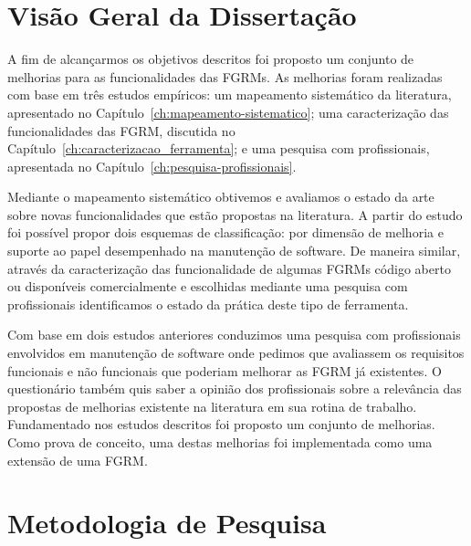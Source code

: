 
\section{Visão Geral da Dissertação}
\label{sec:intro-visao-geral}

A fim de alcançarmos os objetivos descritos foi proposto um conjunto de
melhorias para as funcionalidades das FGRMs. As melhorias foram realizadas com
base em três estudos empíricos: um mapeamento sistemático da literatura,
apresentado no Capítulo~\ref{ch:mapeamento-sistematico}; uma caracterização das
funcionalidades das FGRM, discutida no
Capítulo~\ref{ch:caracterizacao_ferramenta}; e uma pesquisa com profissionais,
apresentada no Capítulo~\ref{ch:pesquisa-profissionais}.

Mediante o mapeamento sistemático obtivemos e avaliamos o estado da arte sobre
novas funcionalidades que estão propostas na literatura. A partir do estudo foi
possível propor dois esquemas de classificação: por dimensão de melhoria e
suporte ao papel desempenhado na manutenção de software. De maneira similar,
através da caracterização das funcionalidade de algumas FGRMs código aberto ou
disponíveis comercialmente e escolhidas mediante uma pesquisa com profissionais
identificamos o estado da prática deste tipo de ferramenta.

Com base em dois estudos anteriores conduzimos uma pesquisa com profissionais
envolvidos em manutenção de software onde pedimos que avaliassem os requisitos
funcionais e não funcionais que poderiam melhorar as FGRM já existentes. O
questionário também quis saber a opinião dos profissionais sobre a relevância
das propostas de me\-lho\-ri\-as existente na literatura em sua rotina de
trabalho. Fundamentado nos estudos descritos foi proposto um conjunto de
melhorias.  Como prova de conceito, uma destas melhorias foi implementada como
uma extensão de uma FGRM\@.

\section{Metodologia de Pesquisa}
\label{sec:intro-metodologia}

